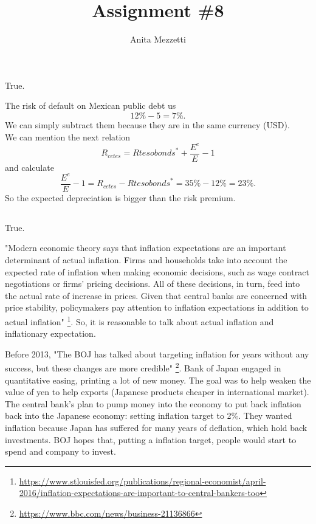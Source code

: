 \documentclass[	11pt, ]{fphw}
\title{Assignment \#8} %
\author{Anita Mezzetti}
\institute{École polytechnique fédérale de Lausanne}
\begin{document}
\maketitle


\section{}
\subsection{}
True. 
\par 
The risk of default on Mexican public debt us 
\[12\%-5=7\%. \]
We can simply subtract them because they are in the same currency (USD). \\
We can mention the next relation 
\[ R_{cetes}=R{tesobonds}^{*}+\frac{E^{e}}{E}-1 \]
and calculate 
\[ \frac{E^{e}}{E}-1=R_{cetes}-R{tesobonds}^{*}=35\%-12\%=23\% .\]
So the expected depreciation is bigger than the risk premium.




\subsection{}
True. 
\par 
"Modern economic theory says that inflation expectations are an important determinant of actual inflation. Firms and households take into account the expected rate of inflation when making economic decisions, such as wage contract negotiations or firms’ pricing decisions. All of these decisions, in turn, feed into the actual rate of increase in prices. Given that central banks are concerned with price stability, policymakers pay attention to inflation expectations in addition to actual inflation" \footnote{\url{https://www.stlouisfed.org/publications/regional-economist/april-2016/inflation-expectations-are-important-to-central-bankers-too}}. 
So, it is reasonable to talk about actual inflation and inflationary expectation. 
\par Before 2013, "The BOJ has talked about targeting inflation for years without any success, but these changes are more credible" \footnote{ \url{https://www.bbc.com/news/business-21136866}}. 
Bank of Japan engaged in quantitative easing, printing a lot of new money. The goal was to help weaken the value of yen to help exports (Japanese products cheaper in international market). The central bank's plan to pump money into the economy to put back inflation back into the Japanese economy: setting inflation target to 2\%. They wanted inflation because Japan has suffered for many years of deflation, which hold back investments. BOJ hopes that, putting a inflation target, people would start to spend and company to invest. 
\end{document}
